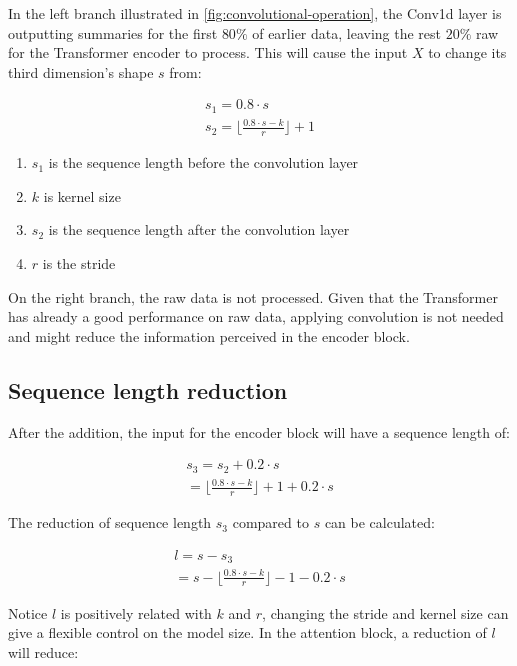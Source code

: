 \documentclass[stu,12pt,floatsintext]{apa7}
\begin{document}
In the left branch illustrated in \ref{fig:convolutional-operation}, the Conv1d layer is outputting summaries for the first $80\%$ of earlier data, leaving the rest $20\%$ raw for the Transformer encoder to process. This will cause the input $X$ to change its third dimension's shape $s$ from:

\begin{gather}
    s_1=0.8\cdot s\\
    s_2=\lfloor\frac{0.8\cdot s-k}{r} \rfloor+1
\end{gather}

\begin{enumerate}
    \item $s_1$ is the sequence length before the convolution layer
    \item $k$ is kernel size
    \item $s_2$ is the sequence length after the convolution layer
    \item $r$ is the stride
\end{enumerate}

On the right branch, the raw data is not processed. Given that the Transformer has already a good performance on raw data, applying convolution is not needed and might reduce the information perceived in the encoder block. 

\subsection{Sequence length reduction}
\label{sec:seq-len-reduction}

After the addition, the input for the encoder block will have a sequence length of:

\begin{gather}
    s_3=s_2+0.2\cdot s\\
    =\lfloor\frac{0.8\cdot s-k}{r} \rfloor+1+0.2\cdot s
\end{gather}

The reduction of sequence length $s_3$ compared to $s$ can be calculated:

\begin{gather}
    l=s-s_3\\
    =s-\lfloor\frac{0.8\cdot s-k}{r} \rfloor-1-0.2\cdot s
\end{gather}

Notice $l$ is positively related with $k$ and $r$, changing the stride and kernel size can give a flexible control on the model size. In the attention block, a reduction of $l$ will reduce:
\end{document}
